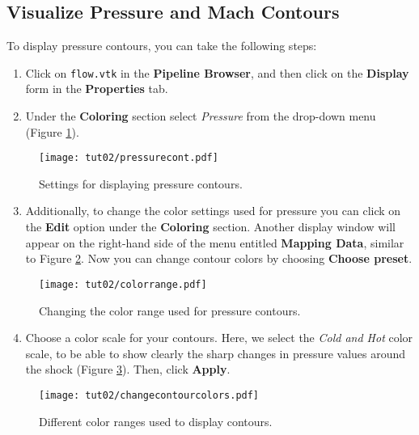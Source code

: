 \subsection{Visualize Pressure and Mach Contours}
To display pressure contours, you can take the following steps:
\begin{enumerate}[label=\arabic*)]
	\item Click on \texttt{flow.vtk} in the \textbf{Pipeline Browser}, and then click on the \textbf{Display} form in the \textbf{Properties} tab.
	\item Under the \textbf{Coloring} section select \textit{Pressure} from the drop-down menu (Figure \ref{fig2:pressure contours setting}).
\end{enumerate}
\begin{figure}[H]
	\centering
	\texttt{[image: tut02/pressurecont.pdf]}
	\caption{Settings for displaying pressure contours.}
	\label{fig2:pressure contours setting}
\end{figure} 
\begin{enumerate}[label=\arabic*)]
	\setcounter{enumi}{2}
	\item Additionally, to change the color settings used for pressure you can click on the \textbf{Edit} option under the \textbf{Coloring} section. Another display window will appear on the right-hand side of the menu entitled \textbf{Mapping Data}, similar to Figure \ref{fig2:color_range}. Now you can change contour colors by choosing \textbf{Choose preset}.
\end{enumerate}  
\begin{figure}[ht]
    \centering
    \texttt{[image: tut02/colorrange.pdf]}
    \caption{Changing the color range used for pressure contours.}
    \label{fig2:color_range}
\end{figure}
\begin{enumerate}[label=\arabic*)]
	\setcounter{enumi}{3}
	\item Choose a color scale for your contours. Here, we select the \textit{Cold and Hot} color scale, to be able to show clearly the sharp changes in pressure values around the shock (Figure \ref{fig2:color_range_item}). Then, click \textbf{Apply}.
\end{enumerate}  
\begin{figure}[ht]
    \centering
    \texttt{[image: tut02/changecontourcolors.pdf]}
    \caption{Different color ranges used to display contours.}
    \label{fig2:color_range_item}
\end{figure}
